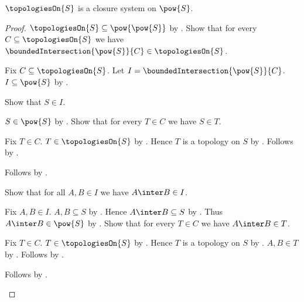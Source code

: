 \begin{theorem}\label{topologies_on_is_closure_system}
    $\topologiesOn{S}$ is a closure system on $\pow{S}$.
\end{theorem}
\begin{proof}
    $\topologiesOn{S}\subseteq\pow{\pow{S}}$ by
        .
    Show that for every $C\subseteq\topologiesOn{S}$ we have
        $\boundedIntersection{\pow{S}}{C}\in\topologiesOn{S}$.
    \begin{subproof}
        Fix $C\subseteq\topologiesOn{S}$.
        Let $I=\boundedIntersection{\pow{S}}{C}$.
        $I\subseteq\pow{S}$ by
            .

        Show that $S\in I$.
        \begin{subproof}
            $S\in\pow{S}$ by .
            Show that for every $T\in C$ we have $S\in T$.
            \begin{subproof}
                Fix $T\in C$.
                $T\in\topologiesOn{S}$ by .
                Hence $T$ is a topology on $S$ by
                    .
                Follows by .
            \end{subproof}
            Follows by .
        \end{subproof}

        Show that for all $A,B\in I$ we have $A\inter B\in I$.
        \begin{subproof}
            Fix $A,B\in I$.
            $A,B\subseteq S$ by .
            Hence $A\inter B\subseteq S$ by .
            Thus $A\inter B\in\pow{S}$ by .
            Show that for every $T\in C$ we have $A\inter B\in T$.
            \begin{subproof}
                Fix $T\in C$.
                $T\in\topologiesOn{S}$ by .
                Hence $T$ is a topology on $S$ by
                    .
                $A,B\in T$ by .
                Follows by .
            \end{subproof}
            Follows by .
        \end{subproof}


\end{subproof}
\end{proof}
